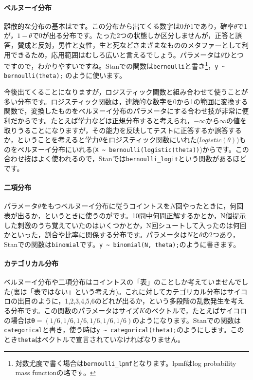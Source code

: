 \documentclass{ltjsbook}
\begin{document}
\paragraph{ベルヌーイ分布}
離散的な分布の基本はです。この分布から出てくる数字は0か1であり，確率$\theta$で1が，$1-\theta$で0が出る分布です。たった2つの状態しか区分しませんが，正答と誤答，賛成と反対，男性と女性，生と死などさまざまなもののメタファーとして利用できるため，応用範囲はむしろ広いと言えるでしょう。パラメータは$\theta$ひとつですので，わかりやすいですね。Stanでの関数は\texttt{bernoulli}と書き\footnote{対数尤度で書く場合は\verb|bernoulli_lpmf|となります。lpmfはlog probability mass functionの略です。}，\verb|y ~ bernoulli(theta);| のように使います。

今後出てくることになりますが，ロジスティック関数と組み合わせて使うことが多い分布です。ロジスティック関数は，連続的な数字を0から1の範囲に変換する関数で，変換したものをベルヌーイ分布のパラメータにする合わせ技が非常に便利だからです。たとえば学力などは正規分布すると考えられ，$-\infty$から$\infty$の値を取りうることになりますが，その能力を反映してテストに正答するか誤答するか，ということを考えると学力$\theta$をロジスティック関数にいれた($logistic(\theta)$)ものをベルヌーイ分布にいれる(\verb|X ~ bernoulli(logistic(theta))|)からです。この合わせ技はよく使われるので，Stanでは\verb|bernoulli_logit|という関数があるほどです。
\paragraph{二項分布}
パラメータ$\theta$をもつベルヌーイ分布に従うコイントスを$N$回やったときに，何回表が出るか，というときに使うのがです。10問中何問正解するかとか，N個提示した刺激のうち覚えていたのはいくつかとか，N回シュートして入ったのは何回かといった，割合や比率に関係する分布です。パラメータは$N$と$\theta$の2つあり，Stanでの関数は\texttt{binomial}です。\verb|y ~ binomial(N, theta);|のように書きます。

\paragraph{カテゴリカル分布}
ベルヌーイ分布や二項分布はコイントスの「表」のことしか考えていませんでした(裏は「表ではない」という考え方)。これに対してカテゴリカル分布はサイコロの出目のように，1,2,3,4,5,6のどれが出るか，という多段階の乱数発生を考える分布です。この関数のパラメータはサイズ$K$のベクトルで，たとえばサイコロの場合は$\bm{\theta}=(1/6,1/6,1/6,1/6,1/6,1/6)$のようになります。Stanでの関数は\texttt{categorical}と書き，使う時は\verb|y ~ categorical(theta);|のようにします。このとき\verb|theta|はベクトルで宣言されていなければなりません。
\end{document}
